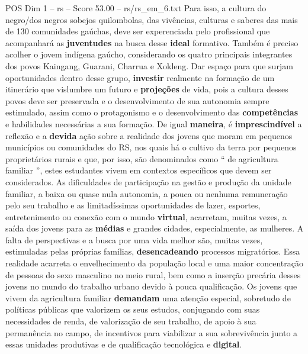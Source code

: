\begin{textsample}{POS Dim 1 – rs – Score 53.00 – rs/rs\_em\_6.txt}
Para isso, a cultura do negro/dos negros sobejos quilombolas, das vivências, culturas e saberes das mais de 130 comunidades gaúchas, deve ser experenciada pelo profissional que acompanhará as \textbf{juventudes} na busca desse \textbf{ideal} formativo.
Também é preciso acolher o jovem indígena gaúcho, considerando os quatro principais integrantes dos povos Kaingang, Guarani, Charrua e Xokleng.
Dar espaço para que surjam oportunidades dentro desse grupo, \textbf{investir} realmente na formação de um itinerário que vislumbre um futuro e \textbf{projeções} de vida, pois a cultura desses povos deve ser preservada e o desenvolvimento de sua autonomia sempre estimulado, assim como o protagonismo e o desenvolvimento das \textbf{competências} e habilidades necessárias a sua formação.
De igual \textbf{maneira}, é \textbf{imprescindível} a reflexão e a \textbf{devida} ação sobre a realidade dos jovens que moram em pequenos municípios ou comunidades do RS, nos quais há o cultivo da terra por pequenos proprietários rurais e que, por isso, são denominados como “ de agricultura familiar ”, estes estudantes vivem em contextos específicos que devem ser considerados.
As dificuldades de participação na gestão e produção da unidade familiar, a baixa ou quase nula autonomia, a pouca ou nenhuma remuneração pelo seu trabalho e as limitadíssimas oportunidades de lazer, esportes, entretenimento ou conexão com o mundo \textbf{virtual}, acarretam, muitas vezes, a saída dos jovens para as \textbf{médias} e grandes cidades, especialmente, as mulheres.
A falta de perspectivas e a busca por uma vida melhor são, muitas vezes, estimuladas pelas próprias famílias, \textbf{desencadeando} processos migratórios.
Essa realidade acarreta o envelhecimento da população local e uma maior concentração de pessoas do sexo masculino no meio rural, bem como a inserção precária desses jovens no mundo do trabalho urbano devido à pouca qualificação.
Os jovens que vivem da agricultura familiar \textbf{demandam} uma atenção especial, sobretudo de políticas públicas que valorizem os seus estudos, conjugando com suas necessidades de renda, de valorização de seu trabalho, de apoio à sua permanência no campo, de incentivos para viabilizar a sua sobrevivência junto a essas unidades produtivas e de qualificação tecnológica e \textbf{digital}.

\end{textsample}
